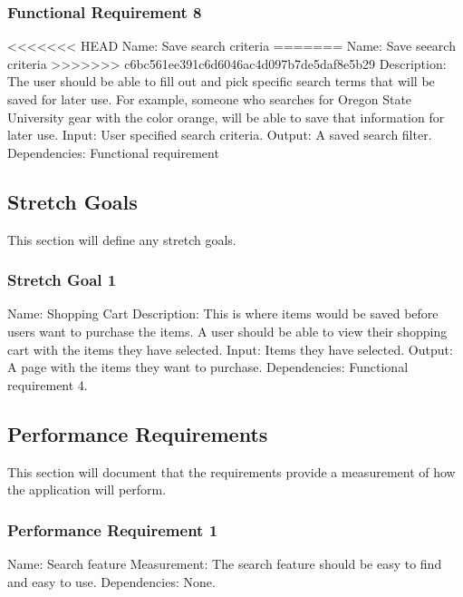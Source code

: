 \documentclass[journal,compsoc, 10pt, draftclsnofoot, onecolumn]{IEEEtran}
\begin{document}
\subsubsection{Functional Requirement 8}
<<<<<<< HEAD
Name: Save search criteria
=======
Name: Save seearch criteria\newline
>>>>>>> c6bc561ee391c6d6046ac4d097b7de5daf8e5b29
Description: The user should be able to fill out and pick specific search terms
that will be saved for later use. For example, someone who searches for Oregon 
State University gear with the color orange, will be able to save that information
for later use.\newline
Input: User specified search criteria.\newline
Output: A saved search filter.\newline
Dependencies: Functional requirement 

\subsection{Stretch Goals}

This section will define any stretch goals.

\subsubsection{Stretch Goal 1}
Name: Shopping Cart\newline
Description: This is where items would be saved before users want to
purchase the items. A user should be able to view their shopping cart with
the items they have selected.\newline
Input: Items they have selected.\newline
Output: A page with the items they want to purchase.\newline
Dependencies: Functional requirement 4.

\subsection{Performance Requirements}

This section will document that the requirements provide a measurement of how 
the application will perform.

\subsubsection{Performance Requirement 1}
Name: Search feature\newline
Measurement: The search feature should be easy to find and easy to use.\newline
Dependencies: None.
\end{document}
